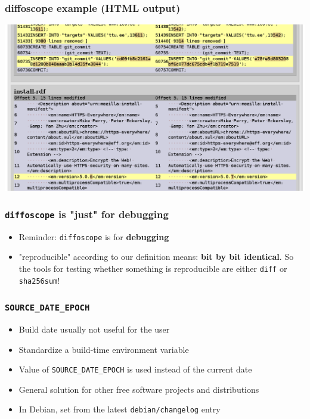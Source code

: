 \documentclass[14pt]{beamer}
\begin{document}
\begin{frame}
 \frametitle{diffoscope example (HTML output)}

 \begin{center}
  \includegraphics[width=0.9\paperwidth]{images/diffoscope_example_html.png}
 \end{center}
\end{frame}

\begin{frame}
 \frametitle{\texttt{diffoscope} is "just" for debugging}

 \begin{itemize}
  \item Reminder: \texttt{diffoscope} is for \textbf{debugging}
  \item<2> "reproducible" according to our definition means: \textbf{bit by bit
  identical}. So the tools for testing whether something is reproducible are
  either \texttt{diff} or \texttt{sha256sum}!
 \end{itemize}
\end{frame}


\begin{frame}
 \frametitle{\texttt{SOURCE\_DATE\_EPOCH}}

 \begin{itemize}
  \item Build date usually not useful for the user
  \item Standardize a build-time environment variable
  \item Value of \texttt{SOURCE\_DATE\_EPOCH} is used instead of the current date
  \item General solution for other free software projects and distributions
  \item In Debian, set from the latest \texttt{debian/changelog} entry
 \end{itemize}
\end{frame}
\end{document}

